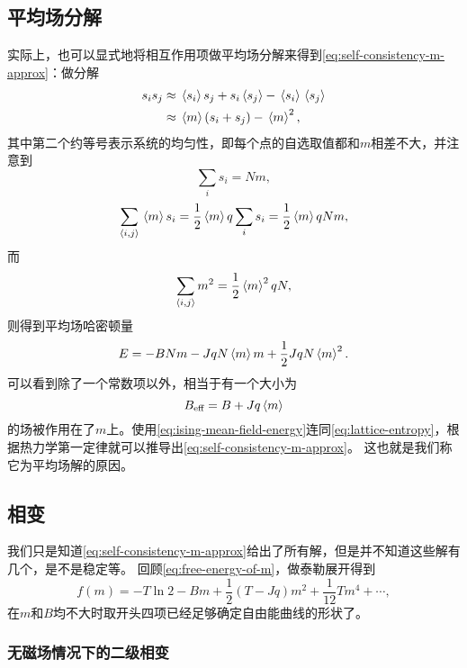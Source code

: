 \documentclass[hyperref, UTF8, a4paper]{ctexart}
\newcommand*{\pair}[1]{\langle #1 \rangle}
\begin{document}
\subsection{平均场分解}

实际上，也可以显式地将相互作用项做平均场分解来得到\eqref{eq:self-consistency-m-approx}：做分解
\begin{equation}
    \begin{aligned}
        s_i s_j &\approx \expval*{s_i} s_j + s_i \expval*{s_j} - \expval*{s_i} \expval*{s_j} \\
        &\approx \expval*{m} (s_i + s_j) - \expval*{m}^2,
    \end{aligned}
    \label{eq:mf-decomp}
\end{equation}
其中第二个约等号表示系统的均匀性，即每个点的自选取值都和$m$相差不大，并注意到
\[
    \sum_i s_i = N m,
\]
\[
    \sum_{\pair{i,j}} \expval*{m} s_i = \frac{1}{2} \expval*{m} q \sum_i s_i = \frac{1}{2} \expval*{m} q N m,
\]
而
\[
    \sum_{\pair{i,j}} m^2 = \frac{1}{2} \expval*{m}^2 q N,
\]
则得到平均场哈密顿量
\begin{equation}
    E = - B N m - J q N \expval*{m} m + \frac{1}{2} J q N \expval*{m}^2.
    \label{eq:ising-mean-field-energy}
\end{equation}
可以看到除了一个常数项以外，相当于有一个大小为
\begin{equation}
    B_\text{eff} = B + J q \expval*{m}
\end{equation}
的场被作用在了$m$上。使用\eqref{eq:ising-mean-field-energy}连同\eqref{eq:lattice-entropy}，根据热力学第一定律就可以推导出\eqref{eq:self-consistency-m-approx}。
这也就是我们称它为平均场解的原因。

\subsection{相变}

我们只是知道\eqref{eq:self-consistency-m-approx}给出了所有解，但是并不知道这些解有几个，是不是稳定等。
回顾\eqref{eq:free-energy-of-m}，做泰勒展开得到
\begin{equation}
    f(m) = - T \ln 2 - Bm + \frac{1}{2} (T-Jq) m^2 + \frac{1}{12} T m^4 + \cdots,
    \label{eq:mf-free-energy-series-m}
\end{equation}
在$m$和$B$均不大时取开头四项已经足够确定自由能曲线的形状了。

\subsubsection{无磁场情况下的二级相变}
\end{document}
